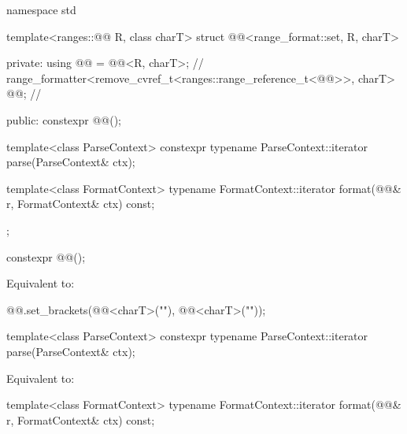 %
\begin{codeblock}
namespace std {
  template<ranges::@@ R, class charT>
  struct @@<range_format::set, R, charT> {
  private:
    using @@ = @@<R, charT>;                  // \expos
    range_formatter<remove_cvref_t<ranges::range_reference_t<@@>>,
                    charT> @@;                                 // \expos

  public:
    constexpr @@();

    template<class ParseContext>
      constexpr typename ParseContext::iterator
        parse(ParseContext& ctx);

    template<class FormatContext>
      typename FormatContext::iterator
        format(@@& r, FormatContext& ctx) const;
  };
}
\end{codeblock}

%
\begin{itemdecl}
constexpr @@();
\end{itemdecl}

\begin{itemdescr}
\pnum
\effects
Equivalent to:
\begin{codeblock}
@@.set_brackets(@@<charT>("{"), @@<charT>("}"));
\end{codeblock}
\end{itemdescr}

%
\begin{itemdecl}
template<class ParseContext>
  constexpr typename ParseContext::iterator
    parse(ParseContext& ctx);
\end{itemdecl}

\begin{itemdescr}
\pnum
\effects
Equivalent to: 
\end{itemdescr}

%
\begin{itemdecl}
template<class FormatContext>
  typename FormatContext::iterator
    format(@@& r, FormatContext& ctx) const;
\end{itemdecl}

